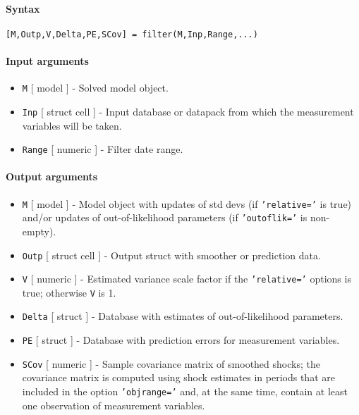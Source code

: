 


	\paragraph{Syntax}\label{syntax}

\begin{verbatim}
[M,Outp,V,Delta,PE,SCov] = filter(M,Inp,Range,...)
\end{verbatim}

\paragraph{Input arguments}\label{input-arguments}

\begin{itemize}
\item
  \texttt{M} {[} model {]} - Solved model object.
\item
  \texttt{Inp} {[} struct \textbar{} cell {]} - Input database or
  datapack from which the measurement variables will be taken.
\item
  \texttt{Range} {[} numeric {]} - Filter date range.
\end{itemize}

\paragraph{Output arguments}\label{output-arguments}

\begin{itemize}
\item
  \texttt{M} {[} model {]} - Model object with updates of std devs (if
  \texttt{'relative='} is true) and/or updates of out-of-likelihood
  parameters (if \texttt{'outoflik='} is non-empty).
\item
  \texttt{Outp} {[} struct \textbar{} cell {]} - Output struct with
  smoother or prediction data.
\item
  \texttt{V} {[} numeric {]} - Estimated variance scale factor if the
  \texttt{'relative='} options is true; otherwise \texttt{V} is 1.
\item
  \texttt{Delta} {[} struct {]} - Database with estimates of
  out-of-likelihood parameters.
\item
  \texttt{PE} {[} struct {]} - Database with prediction errors for
  measurement variables.
\item
  \texttt{SCov} {[} numeric {]} - Sample covariance matrix of smoothed
  shocks; the covariance matrix is computed using shock estimates in
  periods that are included in the option \texttt{'objrange='} and, at
  the same time, contain at least one observation of measurement
  variables.
\end{itemize}

